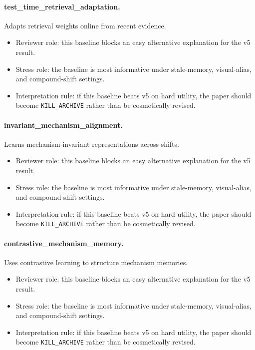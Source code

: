 \documentclass{article}
\begin{document}
\paragraph{test\_time\_retrieval\_adaptation.} Adapts retrieval weights online from recent evidence.
\begin{itemize}
\item Reviewer role: this baseline blocks an easy alternative explanation for the v5 result.
\item Stress role: the baseline is most informative under stale-memory, visual-alias, and compound-shift settings.
\item Interpretation rule: if this baseline beats v5 on hard utility, the paper should become \texttt{KILL\_ARCHIVE} rather than be cosmetically revised.
\end{itemize}
\paragraph{invariant\_mechanism\_alignment.} Learns mechanism-invariant representations across shifts.
\begin{itemize}
\item Reviewer role: this baseline blocks an easy alternative explanation for the v5 result.
\item Stress role: the baseline is most informative under stale-memory, visual-alias, and compound-shift settings.
\item Interpretation rule: if this baseline beats v5 on hard utility, the paper should become \texttt{KILL\_ARCHIVE} rather than be cosmetically revised.
\end{itemize}
\paragraph{contrastive\_mechanism\_memory.} Uses contrastive learning to structure mechanism memories.
\begin{itemize}
\item Reviewer role: this baseline blocks an easy alternative explanation for the v5 result.
\item Stress role: the baseline is most informative under stale-memory, visual-alias, and compound-shift settings.
\item Interpretation rule: if this baseline beats v5 on hard utility, the paper should become \texttt{KILL\_ARCHIVE} rather than be cosmetically revised.
\end{itemize}
\end{document}
